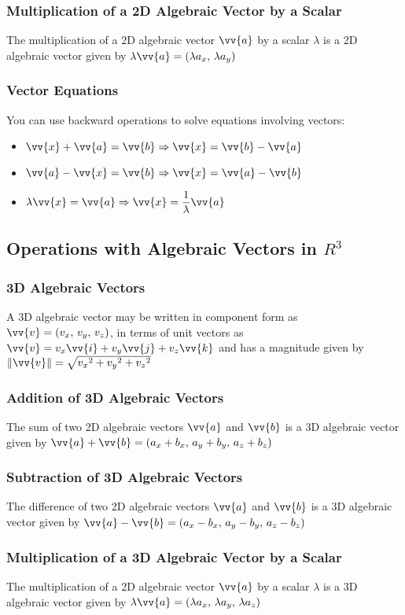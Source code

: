 \documentclass{article}
\newcommand{\mv}[1]{
	\lVert\vv{#1}\rVert
}
\begin{document}
	\subsubsection{Multiplication of a 2D Algebraic Vector by a Scalar}
	The multiplication of a 2D algebraic vector $\vv{a}$ by a scalar $\lambda$ is a 2D algebraic vector given by $\lambda\vv{a}=(\lambda a_x,\,\lambda a_y)$
	\subsubsection{Vector Equations}
	You can use backward operations to solve equations involving vectors:
	\begin{itemize}
		\item $\vv{x}+\vv{a}=\vv{b}\Rightarrow\vv{x}=\vv{b}-\vv{a}$
		\item $\vv{a}-\vv{x}=\vv{b}\Rightarrow\vv{x}=\vv{a}-\vv{b}$
		\item $\lambda\vv{x}=\vv{a}\Rightarrow\vv{x}=\dfrac{1}{\lambda}\vv{a}$
	\end{itemize}
	\subsection{Operations with Algebraic Vectors in $R^3$}
	\subsubsection{3D Algebraic Vectors}
	A 3D algebraic vector may be written in component form as $\vv{v}=(v_x,\,v_y,\,v_z)$, in terms of unit vectors as $\vv{v}=v_x\vv{i}+v_y\vv{j}+v_z\vv{k}$ and has a magnitude given by $\mv{v}=\sqrt{{v_x}^2+{v_y}^2+{v_z}^2}$
	\subsubsection{Addition of 3D Algebraic Vectors}
	The sum of two 2D algebraic vectors $\vv{a}$ and $\vv{b}$ is a 3D algebraic vector given by $\vv{a}+\vv{b}=(a_x+b_x,\,a_y+b_y,\,a_z+b_z)$
	\subsubsection{Subtraction of 3D Algebraic Vectors}
	The difference of two 2D algebraic vectors $\vv{a}$ and $\vv{b}$ is a 3D algebraic vector given by $\vv{a}-\vv{b}=(a_x-b_x,\,a_y-b_y,\,a_z-b_z)$
	\subsubsection{Multiplication of a 3D Algebraic Vector by a Scalar}
	The multiplication of a 2D algebraic vector $\vv{a}$ by a scalar $\lambda$ is a 3D algebraic vector given by $\lambda\vv{a}=(\lambda a_x,\,\lambda a_y,\,\lambda a_z)$
\end{document}
